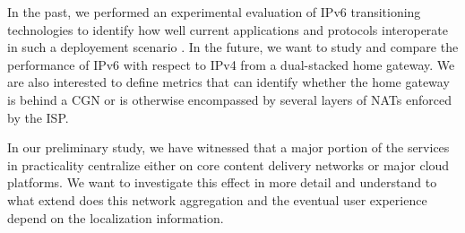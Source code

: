 In the past, we performed an experimental evaluation of IPv6 transitioning
technologies to identify how well current applications and protocols
interoperate in such a deployement scenario \cite{vbajpai:2012}. In the
future, we want to study and compare the performance of IPv6 with respect to
IPv4 from a dual-stacked home gateway.  We are also interested to define
metrics that can identify whether the home gateway is behind a \ac{CGN}  or is
otherwise encompassed by several layers of \ac{NAT}s enforced by the ISP.

In our preliminary study, we have witnessed that a major portion of the
services in practicality centralize either on core content delivery networks
or major cloud platforms. We want to investigate this effect in more detail
and understand to what extend does this network aggregation and the eventual
user experience depend on the localization information.

